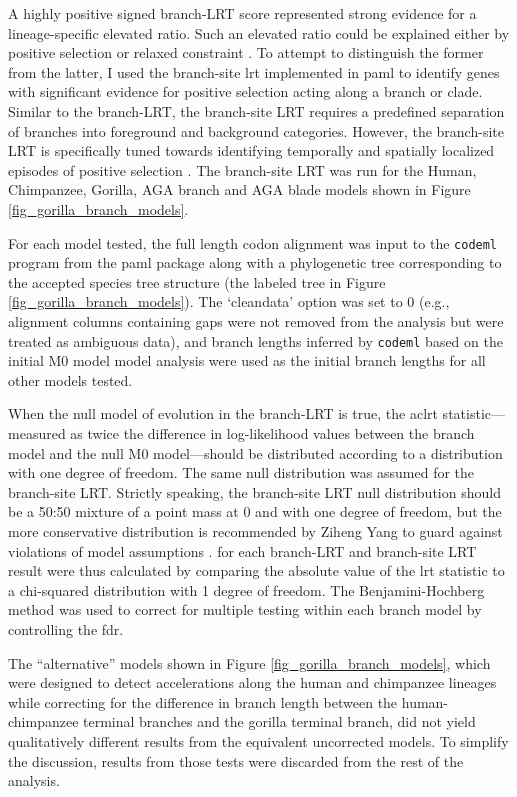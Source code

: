 A highly positive signed branch-LRT score represented strong evidence
for a lineage-specific elevated \dnds ratio. Such an elevated ratio
could be explained either by positive selection or relaxed constraint
\citep{Nielsen2005,Sequencing2005a}. To attempt to distinguish the
former from the latter, I used the branch-site \ac{lrt} implemented in
\ac{paml} \citep{Zhang2005} to identify genes with significant
evidence for positive selection acting along a branch or
clade. Similar to the branch-LRT, the branch-site LRT requires a
predefined separation of branches into foreground and background
categories. However, the branch-site LRT is specifically tuned towards
identifying temporally and spatially localized episodes of positive
selection \citep{Nielsen1998,Yang2002b,Zhang2005}. The branch-site LRT
was run for the Human, Chimpanzee, Gorilla, AGA branch and AGA blade
models shown in Figure \ref{fig_gorilla_branch_models}.

For each model tested, the full length codon alignment was input to
the \texttt{codeml} program from the \ac{paml} package along with a
phylogenetic tree corresponding to the accepted species tree structure
(the labeled tree in Figure \ref{fig_gorilla_branch_models}). The
`cleandata’ option was set to 0 (e.g., alignment columns containing
gaps were not removed from the analysis but were treated as ambiguous
data), and branch lengths inferred by \texttt{codeml} based on the
initial M0 model model analysis were used as the initial branch
lengths for all other models tested.

When the null model of evolution in the branch-LRT is true, the
ac{lrt} statistic---measured as twice the difference in log-likelihood
values between the branch model and the null M0 model---should be
distributed according to a \chisq distribution with one degree of
freedom. The same null distribution was assumed for the branch-site
LRT. Strictly speaking, the branch-site LRT null distribution should
be a 50:50 mixture of a point mass at 0 and \chisq with one degree of
freedom, but the more conservative \chisq distribution is recommended
by Ziheng Yang to guard against violations of model assumptions
\citep{Yang2007}. \pvs for each branch-LRT and branch-site LRT result
were thus calculated by comparing the absolute value of the \ac{lrt}
statistic to a chi-squared distribution with 1 degree of freedom. The
Benjamini-Hochberg method \citep{Benjamini1995} was used to correct
for multiple testing within each branch model by controlling the
\ac{fdr}.

The ``alternative'' models shown in Figure
\ref{fig_gorilla_branch_models}, which were designed to detect
accelerations along the human and chimpanzee lineages while correcting
for the difference in branch length between the human-chimpanzee
terminal branches and the gorilla terminal branch, did not yield
qualitatively different results from the equivalent uncorrected
models. To simplify the discussion, results from those tests were
discarded from the rest of the analysis.

